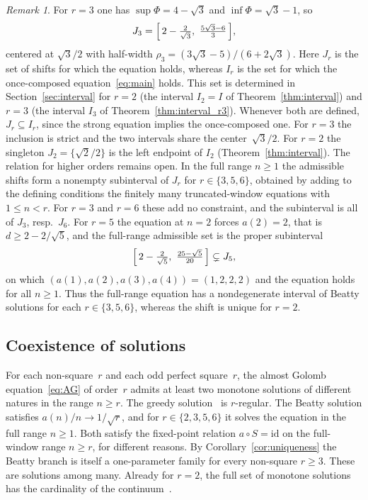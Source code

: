 \documentclass{birkjour}
\theoremstyle{definition}
\theoremstyle{remark}
\newtheorem{remark}[theorem]{Remark}
\begin{document}
\begin{remark}
For $r=3$ one has $\sup\Phi=4-\sqrt{3}$ and
$\inf\Phi=\sqrt{3}-1$, so
\[
  J_{3}=\Bigl[\,2-\tfrac{2}{\sqrt{3}},\ \tfrac{5\sqrt{3}-6}{3}\,\Bigr],
\]
centered at $\sqrt{3}/2$ with half-width
$\rho_{3}=(3\sqrt{3}-5)/(6+2\sqrt{3})$. Here $J_{r}$ is the set of shifts for which the equation holds,
whereas $I_{r}$ is the set for which the once-composed
equation~\eqref{eq:main} holds. This set is determined in
Section~\ref{sec:interval} for $r=2$ (the interval $I_{2}=I$
of Theorem~\ref{thm:interval}) and $r=3$ (the interval $I_{3}$
of Theorem~\ref{thm:interval_r3}). Whenever both are
defined, $J_{r}\subseteq I_{r}$, since the strong equation
implies the once-composed one. For $r=3$ the inclusion is
strict and the two intervals share the center~$\sqrt{3}/2$.
For $r=2$ the singleton $J_{2}=\{\sqrt{2}/2\}$ is the left
endpoint of $I_{2}$ (Theorem~\ref{thm:interval}). The relation
for higher orders remains open. In the
full range $n\ge 1$ the admissible shifts form a nonempty
subinterval of $J_{r}$ for $r\in\{3,5,6\}$, obtained by adding
to the defining conditions the finitely many truncated-window
equations with $1\le n<r$. For $r=3$ and $r=6$ these add no
constraint, and the subinterval is all of $J_{3}$, resp.\
$J_{6}$. For $r=5$ the equation at $n=2$ forces $a(2)=2$, that
is $d\ge 2-2/\!\sqrt{5}$, and the full-range admissible set is
the proper subinterval
\[
  \Bigl[\,2-\tfrac{2}{\sqrt{5}},\ \tfrac{25-\sqrt{5}}{20}\,\Bigr]
  \subsetneq J_{5},
\]
on which $(a(1),a(2),a(3),a(4))=(1,2,2,2)$ and the equation
holds for all $n\ge 1$. Thus the full-range equation has a
nondegenerate interval of Beatty solutions for each
$r\in\{3,5,6\}$, whereas the shift is unique for $r=2$.
\end{remark}

\subsection{Coexistence of solutions}

For each non-square~$r$ and each odd perfect square~$r$,
the almost Golomb equation~\eqref{eq:AG} of order~$r$ admits
at least two monotone solutions of different natures in the
range $n\ge r$. The greedy solution~\cite{Cloitre_AG} is
$r$-regular. The Beatty solution satisfies
$a(n)/n\to 1/\!\sqrt{r}$, and for $r\in\{2,3,5,6\}$ it
solves the equation in the full range $n\ge 1$.
Both satisfy the fixed-point relation $a\circ S=\mathrm{id}$
on the full-window range $n\ge r$, for different reasons. By
Corollary~\ref{cor:uniqueness} the Beatty branch is itself a
one-parameter family for every non-square $r\ge 3$. These are
solutions among many. Already for $r=2$, the full set of
monotone solutions has the cardinality of the
continuum~\cite{Cloitre_tree}.
\end{document}
